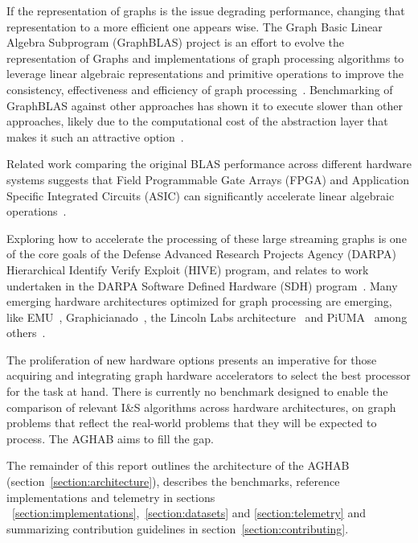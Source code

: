 \par{
    If the representation of graphs is the issue degrading performance, changing that representation to a more efficient one appears wise. 
    The Graph Basic Linear Algebra Subprogram (GraphBLAS) project is an effort to evolve the representation of Graphs and implementations of graph processing algorithms to leverage linear algebraic representations and primitive operations to improve the consistency, effectiveness and efficiency of graph processing~\cite{Mattson2013, Mattson2019, Kepner2015, Kepner2016, Brock2021}.
    Benchmarking of GraphBLAS against other approaches has shown it to execute slower than other approaches, likely due to the computational cost of the abstraction layer that makes it such an attractive option~\cite{Azad2020}.
} 

\par{
    Related work comparing the original BLAS performance across different hardware systems suggests that Field Programmable Gate Arrays (FPGA) and Application Specific Integrated Circuits (ASIC) can significantly accelerate linear algebraic operations~\cite{Kestur2010, Xiong2020}.
    }
\par{
    Exploring how to accelerate the processing of these large streaming graphs is one of the core goals of the Defense Advanced Research Projects Agency (DARPA) Hierarchical Identify Verify Exploit (HIVE) program, and relates to work undertaken in the DARPA Software Defined Hardware (SDH) program~\cite{Regli2022b}.
    Many emerging hardware architectures optimized for graph processing are emerging, like EMU~\cite{Dysart2016}, Graphicianado~\cite{Ham2016}, the Lincoln Labs architecture~\cite{Song2016} and PiUMA~\cite{Aananthakrishnan2020} among others~\cite{Peccerillo2022}.
    }
\par{
    The proliferation of new hardware options presents an imperative for those acquiring and integrating graph hardware accelerators to select the best processor for the task at hand. 
    There is currently no benchmark designed to enable the comparison of relevant I\&S algorithms across hardware architectures, on graph problems that reflect the real-world problems that they will be expected to process. 
    The AGHAB aims to fill the gap. 
    }
\par{
    The remainder of this report outlines the architecture of the AGHAB (section~\ref{section:architecture}), describes the benchmarks, reference implementations and telemetry in sections ~\ref{section:implementations},~\ref{section:datasets} and \ref{section:telemetry} and summarizing contribution guidelines in section~\ref{section:contributing}.
    }
